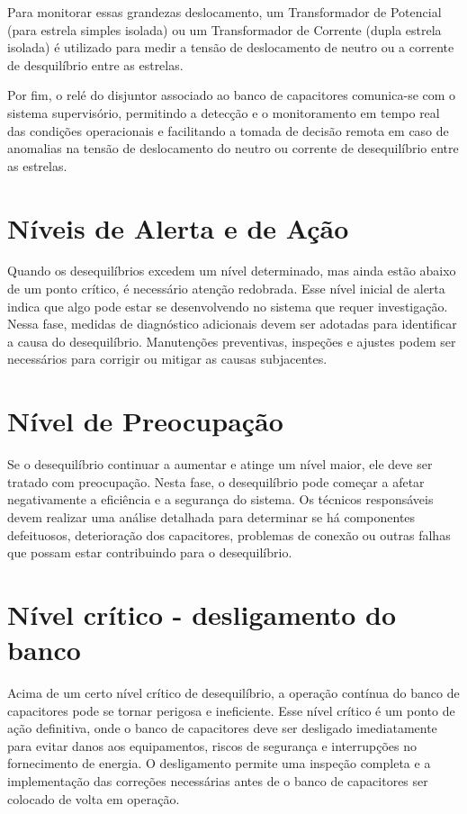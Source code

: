 \documentclass[a4paper]{article}
\begin{document}
Para monitorar essas grandezas deslocamento, um Transformador de Potencial (para estrela simples isolada) ou um Transformador de Corrente (dupla estrela isolada) é utilizado para medir a tensão de deslocamento de neutro ou a corrente de desquilíbrio entre as estrelas.  

Por fim, o relé do disjuntor associado ao banco de capacitores comunica-se com o sistema supervisório, permitindo a detecção e o monitoramento em tempo real das condições operacionais e facilitando a tomada de decisão remota em caso de anomalias na tensão de deslocamento do neutro ou corrente de desequilíbrio entre as estrelas.


\section{Níveis de Alerta e de Ação}
Quando os desequilíbrios excedem um nível determinado, mas ainda estão abaixo de um ponto crítico, é necessário atenção redobrada. Esse nível inicial de alerta indica que algo pode estar se desenvolvendo no sistema que requer investigação. Nessa fase, medidas de diagnóstico adicionais devem ser adotadas para identificar a causa do desequilíbrio. Manutenções preventivas, inspeções e ajustes podem ser necessários para corrigir ou mitigar as causas subjacentes.

\section{Nível de Preocupação}
Se o desequilíbrio continuar a aumentar e atinge um nível maior, ele deve ser tratado com preocupação. Nesta fase, o desequilíbrio pode começar a afetar negativamente a eficiência e a segurança do sistema. Os técnicos responsáveis devem realizar uma análise detalhada para determinar se há componentes defeituosos, deterioração dos capacitores, problemas de conexão ou outras falhas que possam estar contribuindo para o desequilíbrio.

\section{Nível crítico - desligamento do banco}
Acima de um certo nível crítico de desequilíbrio, a operação contínua do banco de capacitores pode se tornar perigosa e ineficiente. Esse nível crítico é um ponto de ação definitiva, onde o banco de capacitores deve ser desligado imediatamente para evitar danos aos equipamentos, riscos de segurança e interrupções no fornecimento de energia. O desligamento permite uma inspeção completa e a implementação das correções necessárias antes de o banco de capacitores ser colocado de volta em operação.
\end{document}
